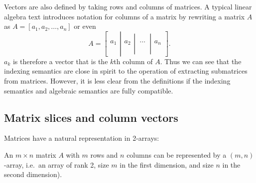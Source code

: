 Vectors are also defined
by taking rows and columns of matrices. A typical linear algebra text
introduces notation for columns of a matrix by rewriting a matrix $A$ as
$A = [a_1, a_2, \dots, a_n]$ or even ~\cite[for example,
p. 6]{Trefethen1997}
\[
A = \left[\left.\begin{array}{c}
\\
\\
a_1\\
\\
\\
\end{array}\right|\begin{array}{c}
\\
\\
a_2\\
\\
\\
\end{array}\left|\begin{array}{c}
\\
\\
\ \cdots\ \\
\\
\\
\end{array}\right|\begin{array}{c}
\\
\\
a_n\\
\\
\\
\end{array}\right]
	.\label{eq:cols}
\]
%
$a_k$ is therefore a vector that is the $k$th column of $A$.  Thus we can see that
the indexing semantics are close in spirit to the operation of extracting
submatrices from matrices. However, it is less clear from the definitions if
the indexing semantics and algebraic semantics are fully compatible.



\subsection{Matrix slices and column vectors}

Matrices have a natural representation in 2-arrays:

An $m \times n$ matrix $A$ with $m$ rows and $n$ columns can be
	represented by a $(m,n)$-array, i.e.\ an array of rank 2, size $m$ in
	the first dimension, and size $n$ in the second
	dimension).\label{rule:mat}


